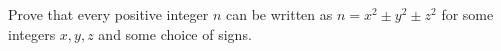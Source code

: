 Prove that every positive integer $n$ can be written as $n=x^2\pm y^2\pm z^2$ for some integers $x,y,z$ and some choice of signs.
